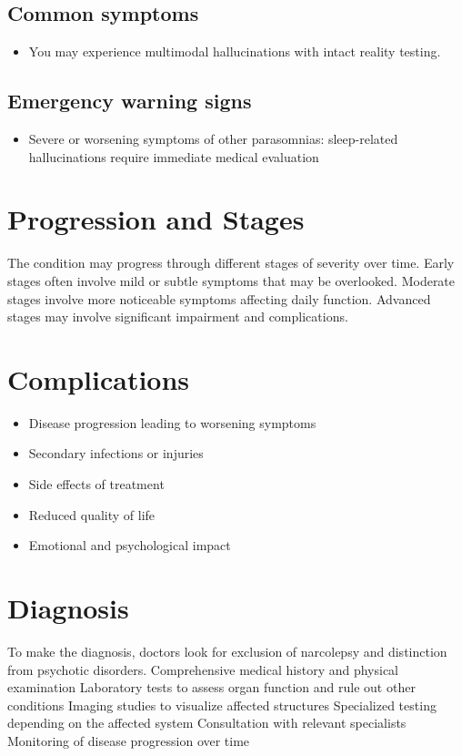 \subsection{Common symptoms}
\begin{itemize}[noitemsep]
  \item You may experience multimodal hallucinations with intact reality testing. 
  \end{itemize}

\subsection{Emergency warning signs}
\begin{itemize}[noitemsep]
  \item Severe or worsening symptoms of other parasomnias: sleep-related hallucinations require immediate medical evaluation
\end{itemize}
\section{Progression and Stages}
The condition may progress through different stages of severity over time. Early stages often involve mild or subtle symptoms that may be overlooked. Moderate stages involve more noticeable symptoms affecting daily function. Advanced stages may involve significant impairment and complications.
\section{Complications}
\begin{itemize}[noitemsep]
  \item Disease progression leading to worsening symptoms
  \item Secondary infections or injuries
  \item Side effects of treatment
  \item Reduced quality of life
  \item Emotional and psychological impact
\end{itemize}
\section{Diagnosis}
To make the diagnosis, doctors look for exclusion of narcolepsy and distinction from psychotic disorders. Comprehensive medical history and physical examination Laboratory tests to assess organ function and rule out other conditions Imaging studies to visualize affected structures Specialized testing depending on the affected system Consultation with relevant specialists Monitoring of disease progression over time

